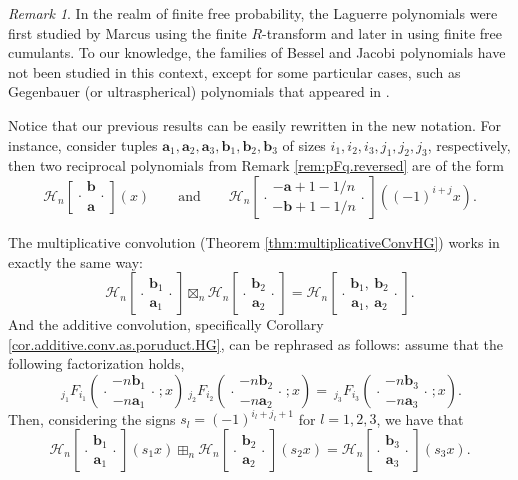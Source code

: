 \documentclass[reqno,11pt]{amsart}
\theoremstyle{remark}
\newtheorem{remark}[theorem]{Remark}
\newcommand*\HGF[5]{%
 {\ }_{#1} F_{#2}{\left(\genfrac..{0pt}{}{#3}{#4};#5\right)}%
}
\newcommand*\HGP[3]{%
 \mathcal{H}_{#1}{\left[\genfrac..{0pt}{1}{#2}{#3}\right]}%
}
\begin{document}
\medskip

\begin{remark}
    In the realm of finite free probability, the Laguerre polynomials were first studied by Marcus \cite[Section 6.2.3]{marcus} using the finite $R$-transform and later in \cite{arizmendi2018cumulants} using finite free cumulants.  To our knowledge, the families of Bessel and Jacobi polynomials have not been studied in this context, except for some particular cases, such as Gegenbauer (or ultraspherical) polynomials that appeared in \cite[Section 6]{gribinski2022rectangular}. 
\end{remark}

\medskip

Notice that our previous results can be easily rewritten in the new notation. For instance, consider tuples $\bm a_1,\bm a_2,\bm a_3,\bm b_1,\bm b_2,\bm b_3 $ of sizes $i_1,i_2,i_3,j_1,j_2,j_3$, respectively, then two reciprocal polynomials from Remark \ref{rem:pFq.reversed} are of the form
\begin{equation}
\label{eq.reversed.freeprob}
\HGP{n}{\bm b}{\bm a }(x) \qquad\text{and}\qquad \HGP{n}{-\bm a+1-1/n}{-\bm b +1-1/n }\left((-1)^{i+j}x\right).  
\end{equation}

The multiplicative convolution (Theorem \ref{thm:multiplicativeConvHG}) works in exactly the same way:
\begin{equation}
\label{eq:multiplicative.rephrased}
\HGP{n}{\bm b_1}{\bm a_1 } \boxtimes_n \HGP{n}{\bm b_2}{\bm a_2 }=\HGP{n}{\bm b_1,\ \bm b_2 }{\bm a_1,\ \bm a_2}.
\end{equation}
And the additive convolution, specifically Corollary \ref{cor.additive.conv.as.poruduct.HG}, can be rephrased as follows:  assume that  the following factorization holds,
\begin{equation}
\label{eq:additive.rephrased.1}  
\HGF{j_1}{i_1}{-n\bm  b_1}{-n\bm a_1}{x}  \HGF{j_2}{i_2}{-n\bm b_2}{-n\bm a_2}{ x}=\HGF{j_3}{i_3}{-n\bm b_3}{-n\bm a_3}{x}.
\end{equation}
Then, considering the signs $s_l=(-1)^{i_l+j_l+1}$ for $l=1,2,3$, we have that
\begin{equation}
 \label{eq:additive.rephrased.2}   
\HGP{n}{\bm b_1}{\bm a_1 }(s_1 x) \boxplus_n \HGP{n}{\bm b_2}{\bm a_2 }(s_2 x) = \HGP{n}{\bm b_3}{\bm a_3 }(s_3 x).
\end{equation}

\medskip
\end{document}
